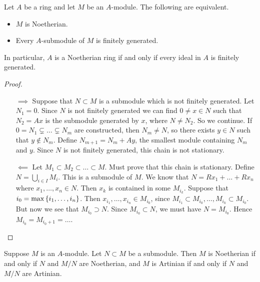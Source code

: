 \begin{proposition}
Let $ A $ be a ring and let $ M $ be an $ A $-module. The following are equivalent.
\begin{itemize}
\item $ M $ is Noetherian.
\item Every $ A $-submodule of $ M $ is finitely generated.
\end{itemize}
In particular, $ A $ is a Noetherian ring if and only if every ideal in $ A $ is finitely generated.
\end{proposition}

\begin{proof}
\hfill
\begin{itemize}
\item[$ \implies $] Suppose that $ N \subset M $ is a submodule which is not finitely generated. Let $ N_1 = 0 $. Since $ N $ is not finitely generated we can find $ 0 \ne x \in N $ such that $ N_2 = Ax $ is the submodule generated by $ x $, where $ N \ne N_2 $. So we continue. If $ 0 = N_1 \subsetneq \dots \subsetneq N_m $ are constructed, then $ N_m \ne N $, so there exists $ y \in N $ such that $ y \notin N_m $. Define $ N_{m + 1} = N_m + Ay $, the smallest module containing $ N_m $ and $ y $. Since $ N $ is not finitely generated, this chain is not stationary.
\item[$ \impliedby $] Let $ M_1 \subset M_2 \subset \dots \subset M $. Must prove that this chain is stationary. Define $ N = \bigcup_{i \in I} M_i $. This is a submodule of $ M $. We know that $ N = Rx_1 + \dots + Rx_n $ where $ x_1, \dots, x_n \in N $. Then $ x_k $ is contained in some $ M_{i_k} $. Suppose that $ i_0 = \max\cbr{i_1, \dots, i_n} $. Then $ x_{i_1}, \dots, x_{i_n} \in M_{i_0} $, since $ M_{i_1} \subset M_{i_0}, \dots, M_{i_k} \subset M_{i_0} $. But now we see that $ M_{i_0} \supset N $. Since $ M_{i_0} \subset N $, we must have $ N = M_{i_0} $. Hence $ M_{i_0} = M_{i_0 + 1} = \dots $.
\end{itemize}
\end{proof}

\begin{proposition}
Suppose $ M $ is an $ A $-module. Let $ N \subset M $ be a submodule. Then $ M $ is Noetherian if and only if $ N $ and $ M / N $ are Noetherian, and $ M $ is Artinian if and only if $ N $ and $ M / N $ are Artinian.
\end{proposition}

